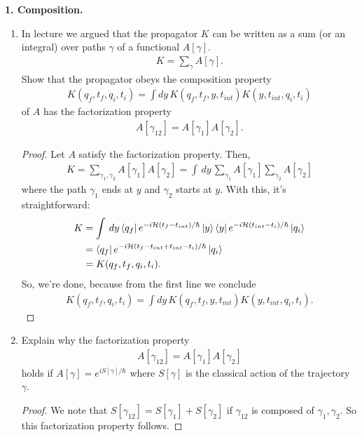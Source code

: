 \documentclass{book}
\theoremstyle{definition}
\newcommand{\nn}{\nonumber}
\newcommand{\had}{\mathcal{H}}
\begin{document}
\noindent \textbf{1. Composition.} 
\begin{enumerate}
	\item In lecture we argued that the propagator $K$ can be written as a sum (or an integral) over paths $\gamma$ of a functional $A[\gamma]$. 
	\begin{align}
	K = \sum_\gamma A[\gamma].
	\end{align}
	Show that the propagator obeys the composition property
	\begin{align}
	K(q_f, t_f, q_i, t_i) = \int dy\, K(q_f,t_f,y,t_{int})K(y,t_{int},q_i ,t_i)
	\end{align}
	of $A$ has the factorization property
	\begin{align}
	A[\gamma_{12}] = A[\gamma_1]A[\gamma_2].
	\end{align}
	
	
	
	\begin{proof}
		Let $A$ satisfy the factorization property. Then, 
		\begin{align}
		K = \sum_{\gamma_1,\gamma_2}A[\gamma_1]A[\gamma_2] = \int \,dy \,\sum_{\gamma_1} A[\gamma_1] \sum_{\gamma_2} A[\gamma_2]
		\end{align}
		where the path $\gamma_1$ ends at $y$ and $\gamma_2$ starts at $y$. With this, it's straightforward:
		\begin{align}
		K &= \int \,dy \bra{q_f}e^{-i\had (t_f - t_{int})/\hbar}\ket{y}\bra{y} e^{-i \had (t_{int} - t_i)/\hbar} \ket{q_i}\nn\\
		&= \bra{q_f}e^{-i\had(t_f - t_{int} + t_{int} - t_i)/\hbar}\ket{q_i}   \nn\\
		&= K(q_f,t_f,q_i,t_i).
		\end{align}
		So, we're done, because from the first line we conclude
		\begin{align}
		K(q_f, t_f, q_i, t_i) = \int dy\, K(q_f,t_f,y,t_{int})K(y,t_{int},q_i ,t_i).
		\end{align}
	\end{proof}
	
	
	
	
	\item Explain why the factorization property
	\begin{align}
	A[\gamma_{12}] = A[\gamma_1]A[\gamma_2]
	\end{align}
	holds if $A[\gamma] = e^{iS[\gamma]/\hbar}$ where $S[\gamma]$ is the classical action of the trajectory $\gamma$.
	
	\begin{proof}
		We note that $S[\gamma_{12}] = S[\gamma_1] + S[\gamma_2]$ if $\gamma_{12}$ is composed of  $\gamma_1,\gamma_2$. So this factorization property follows.
	\end{proof}
	

\end{enumerate}
\end{document}
